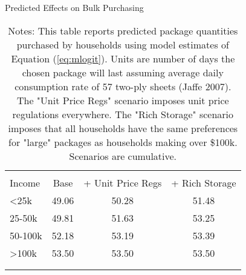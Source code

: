 \begin{table}[!htbp] \centering
\caption{Predicted Effects on Bulk Purchasing}
\label{tab:counterfactualMNLDays}
\begin{tabular}{lccc}
\\[-1.8ex]\hline
\hline \\[-1.8ex]
Income   & Base    & + Unit Price Regs   &  + Rich Storage  \\
\hline
<25k     & 49.06   & 50.28              & 51.48 \\
25-50k   & 49.81   & 51.63              & 53.25 \\
50-100k  & 52.18   & 53.19              & 53.39 \\
>100k    & 53.50   & 53.50              & 53.50 \\
\\[-1.8ex]\hline
\hline \\[-1.8ex]
\end{tabular}
\caption*{Notes: This table reports predicted package quantities purchased by households using model estimates of Equation (\ref{eq:mlogit}). Units are number of days the chosen package will last assuming average daily consumption rate of 57 two-ply sheets (Jaffe 2007). The "Unit Price Regs" scenario imposes unit price regulations everywhere. The "Rich Storage" scenario imposes that all households have the same preferences for "large" packages as households making over \$100k. Scenarios are cumulative.}
\end{table}
